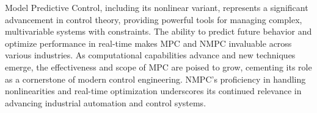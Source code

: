 Model Predictive Control, including its nonlinear variant, represents a significant advancement in control theory, providing powerful tools for managing complex, multivariable systems with constraints. The ability to predict future behavior and optimize performance in real-time makes MPC and NMPC invaluable across various industries. As computational capabilities advance and new techniques emerge, the effectiveness and scope of MPC are poised to grow, cementing its role as a cornerstone of modern control engineering. NMPC's proficiency in handling nonlinearities and real-time optimization underscores its continued relevance in advancing industrial automation and control systems.